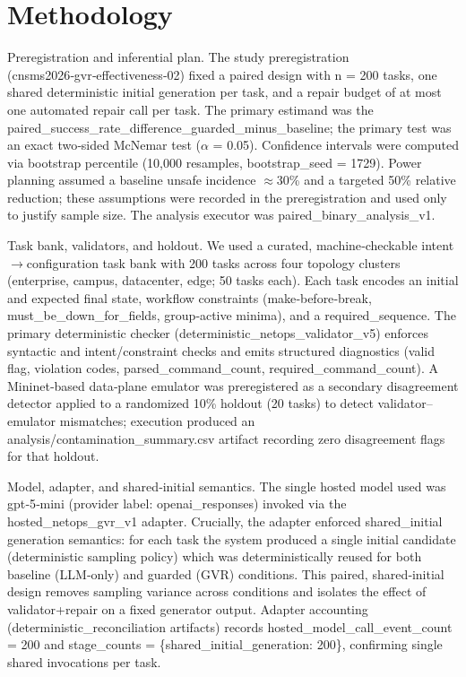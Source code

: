 \documentclass[conference]{IEEEtran}
\begin{document}
\section{Methodology}
Preregistration and inferential plan. The study preregistration (cnsms2026‑gvr‑effectiveness‑02) fixed a paired design with n = 200 tasks, one shared deterministic initial generation per task, and a repair budget of at most one automated repair call per task. The primary estimand was the paired\_success\_rate\_difference\_guarded\_minus\_baseline; the primary test was an exact two‑sided McNemar test (\ensuremath{\alpha} = 0.05). Confidence intervals were computed via bootstrap percentile (10,000 resamples, bootstrap\_seed = 1729). Power planning assumed a baseline unsafe incidence \ensuremath{\approx}30\% and a targeted 50\% relative reduction; these assumptions were recorded in the preregistration and used only to justify sample size. The analysis executor was paired\_binary\_analysis\_v1.

Task bank, validators, and holdout. We used a curated, machine‑checkable intent\ensuremath{\rightarrow}configuration task bank with 200 tasks across four topology clusters (enterprise, campus, datacenter, edge; 50 tasks each). Each task encodes an initial and expected final state, workflow constraints (make‑before‑break, must\_be\_down\_for\_fields, group‑active minima), and a required\_sequence. The primary deterministic checker (deterministic\_netops\_validator\_v5) enforces syntactic and intent/constraint checks and emits structured diagnostics (valid flag, violation codes, parsed\_command\_count, required\_command\_count). A Mininet‑based data‑plane emulator was preregistered as a secondary disagreement detector applied to a randomized 10\% holdout (20 tasks) to detect validator--emulator mismatches; execution produced an analysis/contamination\_summary.csv artifact recording zero disagreement flags for that holdout.

Model, adapter, and shared‑initial semantics. The single hosted model used was gpt‑5‑mini (provider label: openai\_responses) invoked via the hosted\_netops\_gvr\_v1 adapter. Crucially, the adapter enforced shared\_initial generation semantics: for each task the system produced a single initial candidate (deterministic sampling policy) which was deterministically reused for both baseline (LLM‑only) and guarded (GVR) conditions. This paired, shared‑initial design removes sampling variance across conditions and isolates the effect of validator+repair on a fixed generator output. Adapter accounting (deterministic\_reconciliation artifacts) records hosted\_model\_call\_event\_count = 200 and stage\_counts = \{shared\_initial\_generation: 200\}, confirming single shared invocations per task.
\end{document}
